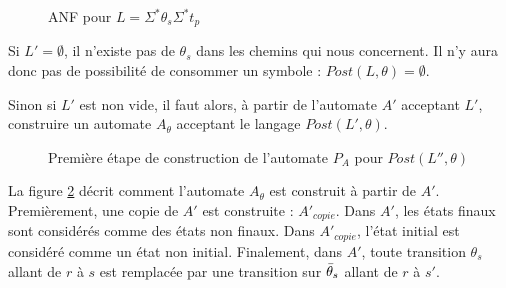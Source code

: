 \begin{figure}[H]
    \centering
    \caption{ANF pour $L=\Sigma^*\theta_s\Sigma^*t_p$}\label{fig:lseconde}
\end{figure}

Si $L'=\emptyset$, il n'existe pas de $\theta_s$ dans les chemins qui nous concernent. Il n'y aura donc pas de possibilité de consommer un symbole : $Post(L,\theta)=\emptyset$.

Sinon si $L'$ est non vide, il faut alors, à partir de l'automate $A'$ acceptant $L'$, construire un automate $A_\theta$ acceptant le langage $Post(L',\theta)$.

\begin{figure}[H]
    \centering
    \caption{Première étape de construction de l'automate $P_A$ pour $Post(L'',\theta)$}\label{fig:aaprime}
\end{figure}

La figure \ref{fig:aaprime} décrit comment l'automate $A_\theta$ est construit à partir de $A'$. Premièrement, une copie de $A'$ est construite : $A'_{copie}$.
Dans $A'$, les états finaux sont considérés comme des états non finaux. Dans $A'_{copie}$, l'état initial est considéré comme un état non initial. Finalement, dans $A'$, toute transition $\theta_s$ allant de $r$ à $s$ est remplacée par une transition sur $\bar{\theta}_s$ allant de $r$ à $s'$.

